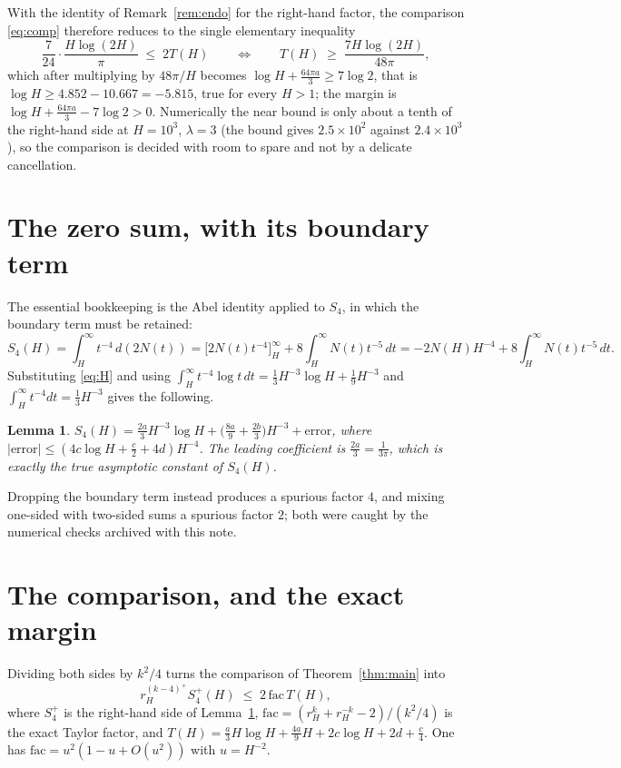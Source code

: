 \documentclass[11pt]{article}
\newtheorem{lemma}[theorem]{Lemma}
\theoremstyle{definition}
\begin{document}
With the identity of Remark~\ref{rem:endo} for the right-hand factor, the comparison
\eqref{eq:comp} therefore reduces to the single elementary inequality
\[
\frac7{24}\cdot\frac{H\log(2H)}{\pi}\;\le\;2T(H)
\qquad\Longleftrightarrow\qquad
T(H)\;\ge\;\frac{7H\log(2H)}{48\pi},
\]
which after multiplying by $48\pi/H$ becomes $\log H+\tfrac{64\pi a}3\ge7\log2$, that is
$\log H\ge4.852-10.667=-5.815$, true for every $H>1$; the margin is
$\log H+\tfrac{64\pi a}3-7\log2>0$. Numerically the near bound is only about a tenth of the
right-hand side at $H=10^{3}$, $\lambda=3$ (the bound gives $2.5\times10^{2}$ against
$2.4\times10^{3}$), so the comparison is decided with room to spare and not by a delicate
cancellation.

\section{The zero sum, with its boundary term}\label{sec:abel}
The essential bookkeeping is the Abel identity applied to $S_4$, in which the boundary term must be
retained:
\[
S_4(H)=\int_H^{\infty}t^{-4}\,d(2N(t))
=\bigl[2N(t)t^{-4}\bigr]_H^{\infty}+8\int_H^{\infty}N(t)t^{-5}\,dt
=-2N(H)H^{-4}+8\int_H^{\infty}N(t)t^{-5}\,dt .
\]
Substituting \eqref{eq:H} and using
$\int_H^\infty t^{-4}\log t\,dt=\tfrac13H^{-3}\log H+\tfrac19H^{-3}$ and
$\int_H^\infty t^{-4}dt=\tfrac13H^{-3}$ gives the following.

\begin{lemma}\label{lem:S4}
$S_4(H)=\frac{2a}3H^{-3}\log H+\bigl(\frac{8a}9+\frac{2b}3\bigr)H^{-3}+\mathrm{error}$, where
$|\mathrm{error}|\le(4c\log H+\tfrac c2+4d)H^{-4}$. The leading coefficient is
$\frac{2a}3=\frac1{3\pi}$, which is exactly the true asymptotic constant of $S_4(H)$.
\end{lemma}

Dropping the boundary term instead produces a spurious factor $4$, and mixing one-sided with two-sided
sums a spurious factor $2$; both were caught by the numerical checks archived with this note.

\section{The comparison, and the exact margin}\label{sec:comparison}
Dividing both sides by $k^{2}/4$ turns the comparison of Theorem~\ref{thm:main} into
\begin{equation}\label{eq:comp}
r_H^{(k-4)^{+}}S_4^{+}(H)\;\le\;2\,\mathrm{fac}\,T(H),
\end{equation}
where $S_4^{+}$ is the right-hand side of Lemma~\ref{lem:S4},
$\mathrm{fac}=(r_H^{k}+r_H^{-k}-2)/(k^{2}/4)$ is the exact Taylor factor, and
$T(H)=\frac a3H\log H+\frac{4a}9H+2c\log H+2d+\frac c4$. One has
$\mathrm{fac}=u^{2}(1-u+O(u^{2}))$ with $u=H^{-2}$.
\end{document}
